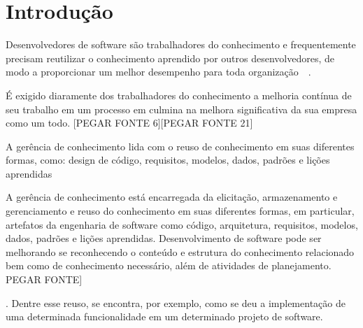 \chapter{Introdução}



Desenvolvedores de software são trabalhadores do conhecimento e frequentemente precisam reutilizar o conhecimento aprendido por outros desenvolvedores, de modo a proporcionar um melhor desempenho para toda organização~\cite{Druker1993}~\cite{Wiig2003}. É exigido diaramente dos trabalhadores do conhecimento a melhoria contínua de seu trabalho em um processo em culmina na melhora significativa da sua empresa como um todo. [PEGAR FONTE 6][PEGAR FONTE 21]A gerência de conhecimento lida com o reuso de conhecimento em  suas diferentes formas, como: design de código, requisitos, modelos, dados, padrões e lições aprendidas~\cite{Levy2009} A gerência de conhecimento está encarregada da elicitação, armazenamento e gerenciamento e reuso do conhecimento em suas diferentes formas, em particular, artefatos da engenharia de software como código, arquitetura, requisitos, modelos, dados, padrões e lições aprendidas. Desenvolvimento de software pode ser melhorando se reconhecendo o conteúdo e estrutura do conhecimento relacionado bem como de conhecimento necessário, além de atividades de planejamento. PEGAR FONTE]
. Dentre esse reuso, se encontra, por exemplo, como se deu a implementação de uma determinada funcionalidade em um determinado projeto de software.


